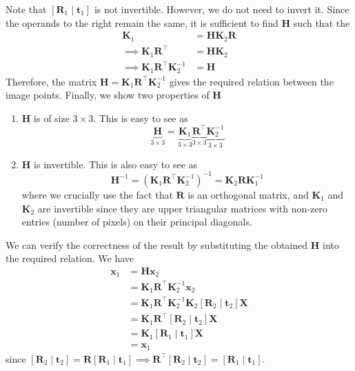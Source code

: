 \documentclass[10pt]{article}
\newcommand{\orientation}[1]{\left[ \mathbf{R}_{#1} \mid \mathbf{t}_{#1} \right]}
\begin{document}
    Note that $\orientation{1}$ is not invertible. However, we do not need to invert it. Since the
    operands to the right remain the same, it is sufficient to find $\mathbf{H}$ such that the
    \begin{align*}
        \mathbf{K}_{1} &= \mathbf{H} \mathbf{K}_{2} \mathbf{R} \\
        \implies \mathbf{K}_{1} \mathbf{R}^{\top} &= \mathbf{H} \mathbf{K}_{2} \\
        \implies \mathbf{K}_{1} \mathbf{R}^{\top} \mathbf{K}_{2}^{-1} &= \mathbf{H}
    \end{align*}
    Therefore, the matrix $\mathbf{H} = \mathbf{K}_{1} \mathbf{R}^{\top} \mathbf{K}_{2}^{-1}$ gives the
    required relation between the image points. Finally, we show two properties of $\mathbf{H}$
    \begin{enumerate}
        \item $\mathbf{H}$ is of size $3 \times 3$. This is easy to see as
        \begin{equation*}
            \underbrace{\mathbf{H}}_{3 \times 3} = \underbrace{\mathbf{K}_{1}}_{3 \times 3}
            \underbrace{\mathbf{R}^{\top}}_{3 \times 3} \underbrace{\mathbf{K}_{2}^{-1}}_{3 \times 3}
        \end{equation*}

        \item $\mathbf{H}$ is invertible. This is also easy to see as
        \begin{equation*}
            \mathbf{H}^{-1} = \left( \mathbf{K}_{1} \mathbf{R}^{\top} \mathbf{K}_{2}^{-1} \right)^{-1}
            = \mathbf{K}_{2} \mathbf{R} \mathbf{K}_{1}^{-1}
        \end{equation*}
        where we crucially use the fact that $\mathbf{R}$ is an orthogonal matrix, and $\mathbf{K}_{1}$
        and $\mathbf{K}_{2}$ are invertible since they are upper triangular matrices with non-zero
        entries (number of pixels) on their principal diagonals.
    \end{enumerate}
    We can verify the correctness of the result by substituting the obtained $\mathbf{H}$ into the
    required relation. We have
    \begin{align*}
        \mathbf{x}_{1} &= \mathbf{H} \mathbf{x}_{2} \\
        &= \mathbf{K}_{1} \mathbf{R}^{\top} \mathbf{K}_{2}^{-1} \mathbf{x}_{2} \\
        &= \mathbf{K}_{1} \mathbf{R}^{\top} \mathbf{K}_{2}^{-1} \mathbf{K}_{2} \orientation{2} \mathbf{X} \\
        &= \mathbf{K}_{1} \mathbf{R}^{\top} \orientation{2} \mathbf{X} \\
        &= \mathbf{K}_{1} \orientation{1} \mathbf{X} \\
        &= \mathbf{x}_{1}
    \end{align*}
    since $\orientation{2} = \mathbf{R} \orientation{1} \implies \mathbf{R}^{\top} \orientation{2} = \orientation{1}$.
\end{document}
